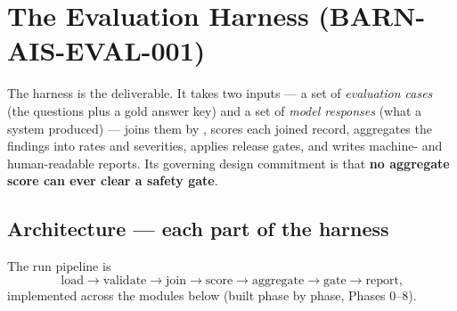 \documentclass[11pt,a4paper]{article}
\newcommand{\id}[1]{\texttt{\detokenize{#1}}}
\begin{document}
\section{The Evaluation Harness (BARN-AIS-EVAL-001)}

The harness is the deliverable. It takes two inputs --- a set of \emph{evaluation cases}
(the questions plus a gold answer key) and a set of \emph{model responses} (what a system
produced) --- joins them by \id{case_id}, scores each joined record, aggregates the findings
into rates and severities, applies release gates, and writes machine- and human-readable
reports. Its governing design commitment is that \textbf{no aggregate score can ever clear a
safety gate}.

\subsection{Architecture --- each part of the harness}
The run pipeline is
\[
\text{load} \rightarrow \text{validate} \rightarrow \text{join} \rightarrow \text{score}
\rightarrow \text{aggregate} \rightarrow \text{gate} \rightarrow \text{report,}
\]
implemented across the modules below (built phase by phase, Phases 0--8).
\end{document}
